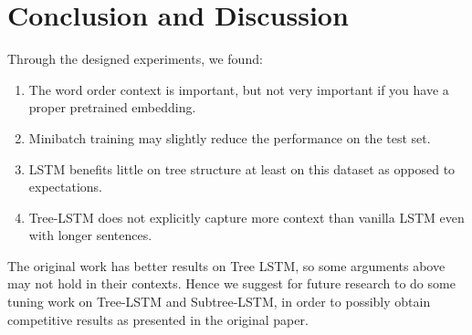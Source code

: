 \section{Conclusion and Discussion}
\label{sec: conclusion}
Through the designed experiments, we found:
\begin{enumerate}
    \vspace{-5pt}
    \item The word order context is important, but not very important if you
    have a proper pretrained embedding.
    \vspace{-7pt}
    \item Minibatch training may slightly reduce the performance on the test
    set.
    \vspace{-7pt}
    \item LSTM benefits little on tree structure at least on this dataset as
    opposed to expectations.
    \vspace{-7pt}
    \item Tree-LSTM does not explicitly capture more context than vanilla LSTM
    even with longer sentences.
\end{enumerate}
The original work\cite{tai2015improved} has better results on Tree LSTM, so some
arguments above may not hold in their contexts. Hence we suggest for future
research to do some tuning work on Tree-LSTM and Subtree-LSTM, in order to
possibly obtain competitive results as presented in the original paper.